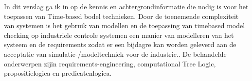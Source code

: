 \documentclass{article}
\begin{document}
	In dit verslag ga ik in op de kennis en achtergrondinformatie die nodig is voor het toepassen van Time-based bodel technieken. 
	Door de toenemende complexiteit van systemen is het gebruik van modellen en de toepassing van timebased model checking  op industriele controle systemen een manier van modelleren van het systeem en de requirements zodat er een bijdagre kan worden geleverd aan de acceptatie van  simulatie-/modeltechniek voor de industrie.\cite{RijnensupervisorsynthesisLock}. 
	De behandelde onderwerpen zijin requirements-engineering, computational Tree Logic, propositielogica en predicatenlogica.
\end{document}

